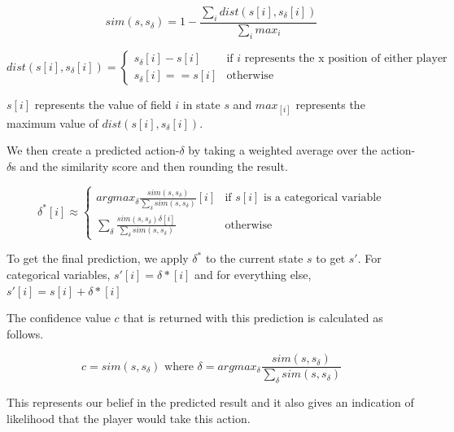 $$sim(s, s_{\delta}) = 1-\frac{\sum_i dist(s[i], s_{\delta}[i])}{\sum_i max_i}$$

$$dist(s[i], s_{\delta}[i]) =
\begin{cases}
s_{\delta}[i] - s[i] & \text{if $i$ represents the x position of either player} \\
s_{\delta}[i] == s[i] & \text{otherwise}
\end{cases}
$$

$s[i]$ represents the value of field $i$ in state $s$ and $max_[i]$ represents the maximum value of $dist(s[i], s_{\delta}[i])$. 

We then create a predicted action-$\delta$ by taking a weighted average over the action-$\delta$s and the similarity score and then rounding the result.

$$\delta^*[i] \approx
\begin{cases}
argmax_\delta \frac{sim(s, s_{\delta})}{\sum_\delta sim(s, s_{\delta})}[i] & \text{if $s[i]$ is a categorical variable} \\
\sum_\delta \frac{sim(s, s_{\delta}) \delta[i] }{\sum_\delta sim(s, s_{\delta})} & \text{otherwise}
\end{cases}
$$

To get the final prediction, we apply $\delta^*$ to the current state $s$ to get $s'$. For categorical variables, $s'[i] = \delta*[i]$ and for everything else, $s'[i] = s[i] + \delta*[i]$

The confidence value $c$ that is returned with this prediction is calculated as follows.

$$c = sim(s, s_{\delta}) \text{ where } \delta = argmax_\delta \frac{sim(s, s_{\delta})}{\sum_\delta sim(s, s_{\delta})}$$

This represents our belief in the predicted result and it also gives an indication of likelihood that the player would take this action.



